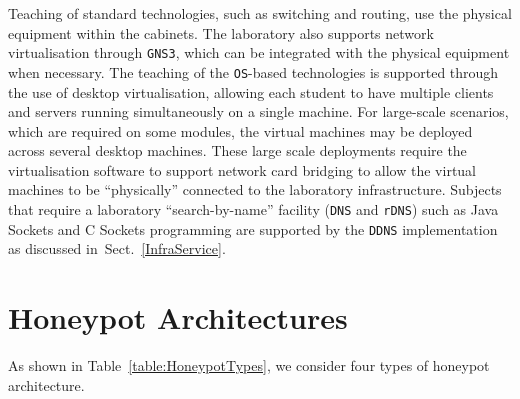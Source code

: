 \documentclass[10pt,journal]{IEEEtran}
\begin{document}
Teaching of standard technologies, such as switching and routing, use the
physical equipment within the cabinets. The laboratory also supports network
virtualisation through \texttt{GNS3}, which can be integrated with the physical
equipment when necessary. The teaching of the \texttt{OS}-based technologies is
supported through the use of desktop virtualisation, allowing each student to
have multiple clients and servers running simultaneously on a single machine.
For large-scale scenarios, which are required on some modules, the virtual
machines may be deployed across several desktop machines. These large scale
deployments require the virtualisation software to support network card
bridging to allow the virtual machines to be ``physically'' connected to the
laboratory infrastructure.  Subjects that require a laboratory
``search-by-name'' facility (\texttt{DNS} and \texttt{rDNS}) such as Java
Sockets and C Sockets programming are supported by the \texttt{DDNS}
implementation as discussed in~Sect.~\ref{InfraService}.

\section{Honeypot Architectures}\label{sec:HoneyArch}

As shown in Table~\ref{table:HoneypotTypes}, we consider four types 
of honeypot architecture.
\end{document}
